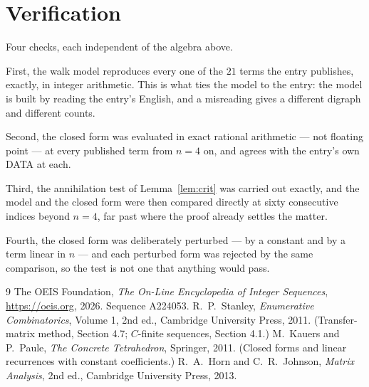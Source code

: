 \documentclass[11pt,a4paper]{article}
\theoremstyle{plain}
\theoremstyle{definition}
\begin{document}
\section{Verification}

Four checks, each independent of the algebra above.

First, the walk model reproduces every one of the $21$ terms the entry publishes,
exactly, in integer arithmetic. This is what ties the model to the entry: the model is built
by reading the entry's English, and a misreading gives a different digraph and different
counts.

Second, the closed form was evaluated in exact rational arithmetic --- not floating point ---
at every published term from $n=4$ on, and agrees with the entry's own DATA at each.

Third, the annihilation test of Lemma~\ref{lem:crit} was carried out exactly, and the model
and the closed form were then compared directly at sixty consecutive indices beyond
$n=4$, far past where the proof already settles the matter.

Fourth, the closed form was deliberately perturbed --- by a constant and by a term linear in
$n$ --- and each perturbed form was rejected by the same comparison, so the test is not one
that anything would pass.

\begin{thebibliography}{9}
 The OEIS Foundation, \emph{The On-Line Encyclopedia of Integer
Sequences}, \url{https://oeis.org}, 2026. Sequence A224053.
 R.~P.~Stanley, \emph{Enumerative Combinatorics}, Volume 1, 2nd ed.,
Cambridge University Press, 2011. (Transfer-matrix method, Section 4.7; $C$-finite sequences,
Section 4.1.)
 M.~Kauers and P.~Paule, \emph{The Concrete Tetrahedron}, Springer, 2011.
(Closed forms and linear recurrences with constant coefficients.)
 R.~A.~Horn and C.~R.~Johnson, \emph{Matrix Analysis}, 2nd ed., Cambridge
University Press, 2013.
\end{thebibliography}
\end{document}
